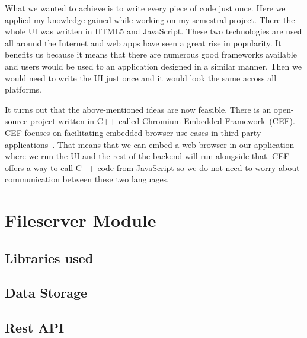 \par
What we wanted to achieve is to write every piece of code just once. Here we applied my knowledge gained while working on my semestral project. There the whole UI was written in HTML5 and JavaScript. These two technologies are used all around the Internet and web apps have seen a great rise in popularity. It benefits us because it means that there are numerous good frameworks available and users would be used to an application designed in a similar manner. Then we would need to write the UI just once and it would look the same across all platforms.
\par
It turns out that the above-mentioned ideas are now feasible. There is an open-source project written in C++ called Chromium Embedded Framework~(CEF). CEF focuses on facilitating embedded browser use cases in third-party applications~\citep{cef}. That means that we can embed a web browser in our application where we run the UI and the rest of the backend will run alongside that. CEF offers a way to call C++ code from JavaScript so we do not need to worry about communication between these two languages.

\section{Fileserver Module}

\subsection{Libraries used}

\subsection{Data Storage}

\subsection{Rest API}

